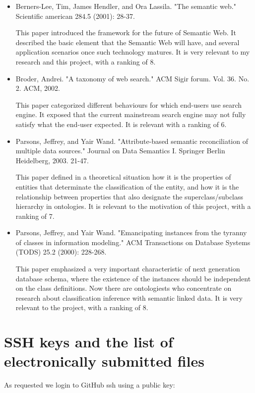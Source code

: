 \documentclass[12pt]{cls}
\begin{document}
\begin{itemize}
\item Berners-Lee, Tim, James Hendler, and Ora Lassila. "The semantic web." Scientific american 284.5 (2001): 28-37.

This paper introduced the framework for the future of Semantic Web. It described the basic element that the Semantic Web will have, and several application scenarios once such technology matures. It is very relevant to my research and this project, with a ranking of 8.

\item Broder, Andrei. "A taxonomy of web search." ACM Sigir forum. Vol. 36. No. 2. ACM, 2002.

This paper categorized different behaviours for which end-users use search engine. It exposed that the current mainstream search engine may not fully satisfy what the end-user expected. It is relevant with a ranking of 6.

\item Parsons, Jeffrey, and Yair Wand. "Attribute-based semantic reconciliation of multiple data sources." Journal on Data Semantics I. Springer Berlin Heidelberg, 2003. 21-47.

This paper defined in a theoretical situation how it is the properties of entities that determinate the classification of the entity, and how it is the relationship between properties that also designate the superclass/subclass hierarchy in ontologies. It is relevant to the motivation of this project, with a ranking of 7. 

\item Parsons, Jeffrey, and Yair Wand. "Emancipating instances from the tyranny of classes in information modeling." ACM Transactions on Database Systems (TODS) 25.2 (2000): 228-268.

This paper emphasized a very important characteristic of next generation database schema, where the existence of the instances should be independent on the class definitions. Now there are ontologiests who concentrate on research about classification inference with semantic linked data. It is very relevant to the project, with a ranking of 8.
\end{itemize}

\section{SSH keys and the list of electronically submitted files}

As requested we login to GitHub ssh using a public key:
\end{document}
